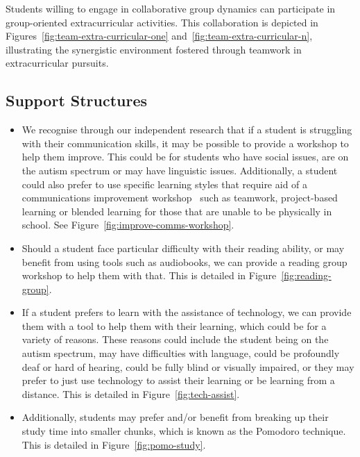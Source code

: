 Students willing to engage in collaborative group dynamics can participate in group-oriented extracurricular activities. This collaboration is depicted in Figures~\ref{fig:team-extra-curricular-one} and~\ref{fig:team-extra-curricular-n}, illustrating the synergistic environment fostered through teamwork in extracurricular pursuits.

\subsection{Support Structures}
\begin{itemize}
    \item We recognise through our independent research that if a student is struggling with their communication skills, it may be possible to provide a workshop to help them improve. This could be for students who have social issues, are on the autism spectrum or may have linguistic issues. Additionally, a student could also prefer to use specific learning styles that require aid of a communications improvement workshop \textemdash~such as teamwork, project-based learning or blended learning for those that are unable to be physically in school. See Figure~\ref{fig:improve-comms-workshop}.
    \item Should a student face particular difficulty with their reading ability, or may benefit from using tools such as audiobooks, we can provide a reading group workshop to help them with that. This is detailed in Figure~\ref{fig:reading-group}.
    \item If a student prefers to learn with the assistance of technology, we can provide them with a tool to help them with their learning, which could be for a variety of reasons. These reasons could include the student being on the autism spectrum, may have difficulties with language, could be profoundly deaf or hard of hearing, could be fully blind or visually impaired, or they may prefer to just use technology to assist their learning or be learning from a distance. This is detailed in Figure~\ref{fig:tech-assist}.
    \item Additionally, students may prefer and/or benefit from breaking up their study time into smaller chunks, which is known as the Pomodoro technique. This is detailed in Figure~\ref{fig:pomo-study}.
\end{itemize}